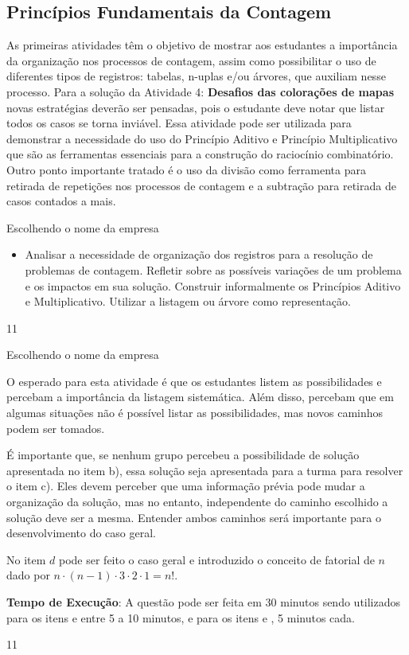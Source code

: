 \begin{texto}
{
  \section{Princípios Fundamentais da Contagem}
  As primeiras atividades têm o objetivo de mostrar aos estudantes a importância da organização nos processos de contagem, assim como possibilitar o uso de diferentes tipos de registros: tabelas, n-uplas e/ou árvores, que auxiliam nesse processo.  Para a solução da Atividade 4: \textbf{Desafios das colorações de mapas}  novas estratégias deverão ser pensadas, pois  o estudante deve notar que listar todos os casos se torna inviável.  Essa atividade pode ser utilizada para demonstrar a necessidade do uso do Princípio Aditivo e Princípio Multiplicativo que são as ferramentas essenciais para a construção do raciocínio combinatório.  Outro ponto importante tratado é o uso da divisão como ferramenta para retirada de repetições nos processos de contagem e a subtração para retirada de casos contados a mais.
}
\end{texto}
\begin{objectives}{Escolhendo o nome da empresa}
{
\begin{itemize}
\item Analisar a necessidade de organização dos registros para a resolução de problemas de contagem. Refletir sobre as possíveis variações de um problema e os impactos em sua solução. Construir informalmente os Princípios Aditivo e Multiplicativo. Utilizar a listagem ou árvore como representação.
\end{itemize}
}{1}{1}
\end{objectives}
\mspace{-2em}
\begin{sugestions}{Escolhendo o nome da empresa}
{
O esperado para esta atividade é que os estudantes listem as possibilidades e percebam a importância da listagem sistemática. Além disso, percebam que em algumas situações não é possível listar as possibilidades, mas novos caminhos podem ser tomados.

É importante que, se nenhum grupo percebeu a possibilidade de solução apresentada no item b), essa solução seja apresentada para a turma para resolver o item c). Eles devem perceber que uma informação prévia pode mudar a organização da solução, mas no entanto, independente do caminho escolhido a solução deve ser a mesma. Entender ambos caminhos será importante para o desenvolvimento do caso geral.

No item $d$ pode ser feito o caso geral  e introduzido o conceito de fatorial de $n$ dado por $n \cdot (n-1) \cdot 3 \cdot 2 \cdot 1= n!$.

\textbf{Tempo de Execução}: A questão pode ser feita em 30 minutos sendo utilizados para os itens  e  entre 5 a 10 minutos, e para os itens  e , 5 minutos cada.  
}{1}{1}
\end{sugestions}
